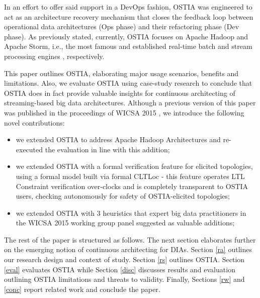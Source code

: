 In an effort to offer said support in a DevOps fashion, OSTIA was engineered to act as an architecture recovery mechanism that closes the feedback loop between operational data architectures (Ops phase) and their refactoring phase (Dev phase). As previously stated, currently, OSTIA focuses on Apache Hadoop and Apache Storm, i.e., the most famous and established real-time batch and stream processing engines \cite{storm, toshniwal2014storm}, respectively. 

This paper outlines OSTIA, elaborating major usage scenarios, benefits and limitations. Also, we evaluate OSTIA using case-study research to conclude that OSTIA does in fact provide valuable insights for continuous architecting of streaming-based big data architectures. Although a previous version of this paper was published in the proceedings of WICSA 2015 \cite{wicsabd}, we introduce the following novel contributions:
\begin{itemize}
\item we extended OSTIA to address Apache Hadoop Architectures and re-executed the evaluation in line with this addition;
\item we extended OSTIA with a formal verification feature for elicited topologies, using a formal model built via formal CLTLoc - this feature operates LTL Constraint verification  over-clocks and is completely transparent to OSTIA users, checking autonomously for  safety of OSTIA-elicited topologies;
\item we extended OSTIA with 3 heuristics that expert big data practitioners in the WICSA 2015 working group panel suggested as valuable additions;
\end{itemize}

The rest of the paper is structured as follows. The next section elaborates further on the emerging notion of continuous architecting for DIAs. Section \ref{ra} outlines our research design and context of study. Section \ref{rs} outlines OSTIA. Section \ref{eval} evaluates OSTIA while Section \ref{disc} discusses results and evaluation outlining OSTIA limitations and threats to validity. Finally, Sections \ref{rw} and \ref{conc} report related work and conclude the paper.


